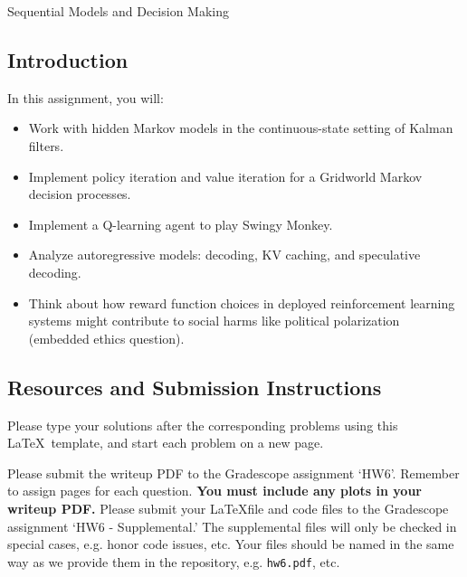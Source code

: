 \documentclass[submit]{../harvardml}
\begin{document}
\begin{center}
{\Large Sequential Models and Decision Making}\\


\end{center}

\subsection*{Introduction}

In this assignment, you will:
\begin{itemize}
    \item Work with hidden Markov models in the continuous-state setting of Kalman filters.
    \item Implement policy iteration and value iteration for a Gridworld Markov decision processes.
    \item Implement a Q-learning agent to play Swingy Monkey.
    \item Analyze autoregressive models: decoding, KV caching, and speculative decoding.
    \item Think about how reward function choices in deployed reinforcement learning systems might contribute to social harms like political polarization (embedded ethics question).
\end{itemize}

\subsection*{Resources and Submission Instructions}

Please type your solutions after the corresponding problems using this \LaTeX\ template, and start each problem on a new page.

Please submit the writeup PDF to the Gradescope assignment `HW6'. Remember to assign pages for each question.  \textbf{You must include any plots in your writeup PDF.} Please submit your \LaTeX file and code files to the Gradescope assignment `HW6 - Supplemental.' The supplemental files will only be checked in special cases, e.g. honor code issues, etc. Your files should be named in the same way as we provide them in the repository, e.g. \texttt{hw6.pdf}, etc.
\\

\newpage
\end{document}
